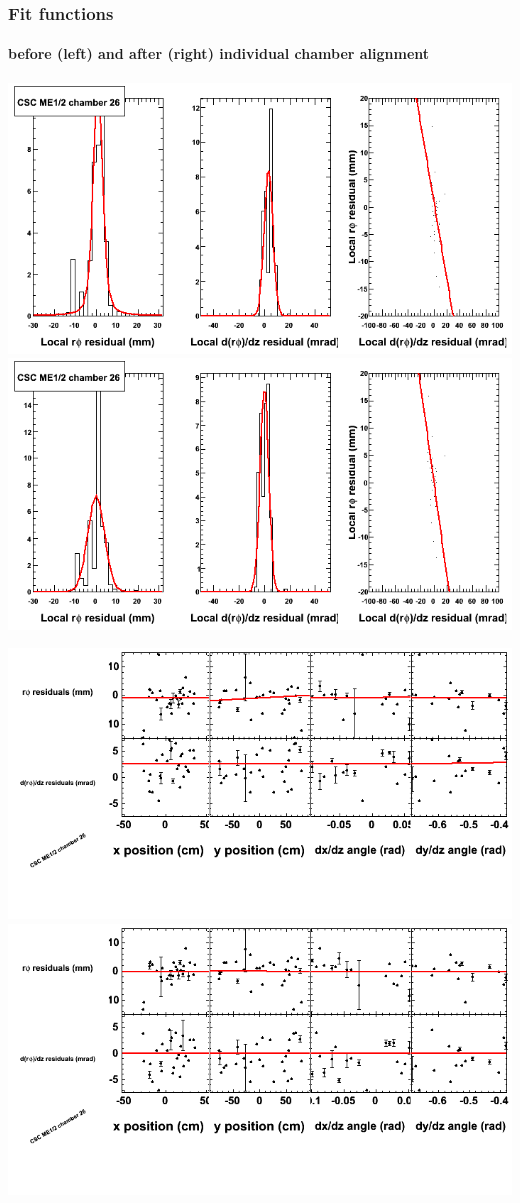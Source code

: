 \documentclass[compress]{beamer}
\begin{document}
\begin{frame}
\frametitle{Fit functions}
\framesubtitle{before (left) and after (right) individual chamber alignment}
\includegraphics[width=0.5\linewidth]{ringfits_3dof/beforefit_MEp12_26_bellcurve.png} \includegraphics[width=0.5\linewidth]{ringfits_3dof/afterfit_MEp12_26_bellcurve.png}

\includegraphics[width=0.5\linewidth]{ringfits_3dof/beforefit_MEp12_26_polynomials.png} \includegraphics[width=0.5\linewidth]{ringfits_3dof/afterfit_MEp12_26_polynomials.png}
\end{frame}
\end{document}
